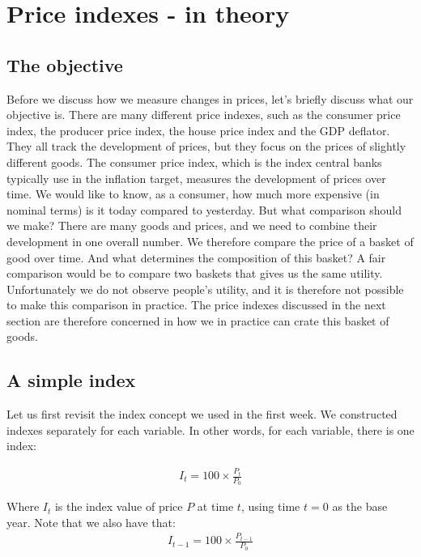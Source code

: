 \documentclass[]{book}
\begin{document}
\hypertarget{price-indexes---in-theory}{%
\section{Price indexes - in theory}\label{price-indexes---in-theory}}

\hypertarget{the-objective}{%
\subsection{The objective}\label{the-objective}}

Before we discuss how we measure changes in prices, let's briefly discuss what our objective is. There are many different price indexes, such as the consumer price index, the producer price index, the house price index and the GDP deflator. They all track the development of prices, but they focus on the prices of slightly different goods. The consumer price index, which is the index central banks typically use in the inflation target, measures the development of prices over time. We would like to know, as a consumer, how much more expensive (in nominal terms) is it today compared to yesterday. But what comparison should we make? There are many goods and prices, and we need to combine their development in one overall number. We therefore compare the price of a basket of good over time. And what determines the composition of this basket? A fair comparison would be to compare two baskets that gives us the same utility. Unfortunately we do not observe people's utility, and it is therefore not possible to make this comparison in practice. The price indexes discussed in the next section are therefore concerned in how we in practice can crate this basket of goods.

\hypertarget{a-simple-index}{%
\subsection{A simple index}\label{a-simple-index}}

Let us first revisit the index concept we used in the first week. We constructed indexes separately for each variable. In other words, for each variable, there is one index:

\begin{align}
    I_t=100\times \frac{P_t}{P_0}
    \label{eq1}
\end{align}

Where \(I_t\) is the index value of price \(P\) at time \(t\), using time \(t=0\) as the base year. Note that we also have that:
\begin{align}
    I_{t-1}=100\times \frac{P_{t-1}}{P_0}
    \label{eq2}
\end{align}
\end{document}
